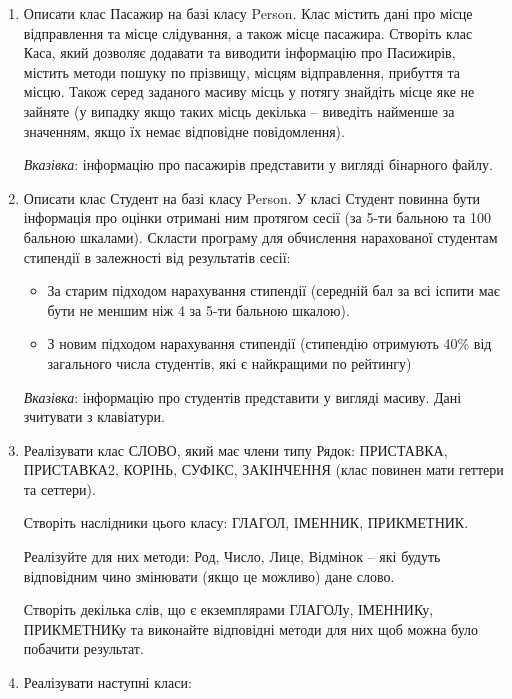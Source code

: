 \documentclass[a5paper,titlepage,openany,twoside,draft]{book_unv}%
\begin{document}
\begin{enumerate}
\def\labelenumi{\arabic{enumi})}
\setcounter{enumi}{2}
\item
  Описати клас Пасажир на базі класу Person. Клас містить дані про місце
  відправлення та місце слідування, а також місце пасажира. Створіть
  клас Каса, який дозволяє додавати та виводити інформацію про
  Пасижирів, містить методи пошуку по прізвищу, місцям відправлення,
  прибуття та місцю. Також серед заданого масиву місць у потягу знайдіть
  місце яке не зайняте (у випадку якщо таких місць декілька -- виведіть
  найменше за значенням, якщо їх немає відповідне повідомлення).

  \emph{\emph{Вказівка}}: інформацію про пасажирів представити у вигляді
бінарного файлу.

\item
  Описати клас Студент на базі класу Person. 
У класі Студент повинна бути інформація про оцінки отримані ним протягом
сесії (за 5-ти бальною та 100 бальною шкалами).
Скласти програму для обчислення нарахованої студентам стипендії в
залежності від результатів сесії:

\begin{itemize}
\item
  За старим підходом нарахування стипендії (середній бал за всі іспити
  має бути не меншим ніж 4 за 5-ти бальною шкалою).
\item
  З новим підходом нарахування стипендії (стипендію отримують 40\% від
  загального числа студентів, які є найкращими по рейтингу)
\end{itemize}

\emph{\emph{Вказівка}}: інформацію про студентів представити у вигляді
масиву. Дані зчитувати з клавіатури.

\item
  Реалізувати клас СЛОВО, який має члени типу Рядок: ПРИСТАВКА,
  ПРИСТАВКА2, КОРІНЬ, СУФІКС, ЗАКІНЧЕННЯ (клас повинен мати геттери та
  сеттери).

Створіть наслідники цього класу: ГЛАГОЛ, ІМЕННИК, ПРИКМЕТНИК.

Реалізуйте для них методи: Род, Число, Лице, Відмінок -- які будуть
відповідним чино змінювати (якщо це можливо) дане слово.

Створіть декілька слів, що є екземплярами ГЛАГОЛу, ІМЕННИКу, ПРИКМЕТНИКу
та виконайте відповідні методи для них щоб можна було побачити
результат.

\item
  Реалізувати наступні класи:


\end{enumerate}
\end{document}
